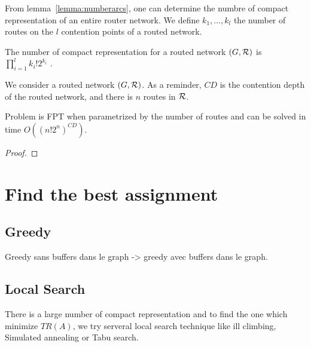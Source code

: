 \documentclass[english]{article}
\begin{document}
From lemma~\ref{lemma:numberarcs}, one can determine the numbre of compact representation of an entire router network.
We define $k_1,\ldots,k_l$ the number of routes on the $l$ contention points of a routed network.
\begin{lemma}
 The number of compact representation for a routed network $(G,{\cal R})$ is $\prod_{i=1}^l k_i!2^{k_i}$ .
 \label{lemma:numbergraph}
\end{lemma}

We consider a routed network $(G,{\cal R})$. As a reminder, $CD$ is the contention depth of the routed network, and  there is $n$ routes in ${\cal R}$.
\begin{theorem}
 Problem \spall is FPT when parametrized by the number of routes and can be solved in time $O( ( n!2^{n})^{CD})$.
\end{theorem}
\begin{proof}
\end{proof}




\section{Find the best assignment}
\subsection{Greedy}
Greedy sans buffers dans le graph -> greedy avec buffers dans le graph.

\subsection{Local Search}

There is a large number of compact representation and to find the one which minimize $TR(A)$, we try serveral local search technique like ill climbing, Simulated annealing or Tabu search.\\
\end{document}
